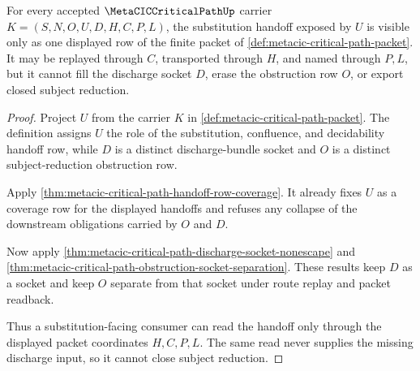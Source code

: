 \begin{theorem}
\label{thm:metacic-critical-path-substitution-handoff-visibility}
For every accepted $\MetaCICCriticalPathUp$ carrier $K=(S,N,O,U,D,H,C,P,L)$, the substitution handoff exposed by $U$ is visible only as one displayed row of the finite packet of \autoref{def:metacic-critical-path-packet}. It may be replayed through $C$, transported through $H$, and named through $P,L$, but it cannot fill the discharge socket $D$, erase the obstruction row $O$, or export closed subject reduction.
\end{theorem}
\begin{proof}
Project $U$ from the carrier $K$ in \autoref{def:metacic-critical-path-packet}. The definition assigns $U$ the role of the substitution, confluence, and decidability handoff row, while $D$ is a distinct discharge-bundle socket and $O$ is a distinct subject-reduction obstruction row.

Apply \autoref{thm:metacic-critical-path-handoff-row-coverage}. It already fixes $U$ as a coverage row for the displayed handoffs and refuses any collapse of the downstream obligations carried by $O$ and $D$.

Now apply \autoref{thm:metacic-critical-path-discharge-socket-nonescape} and \autoref{thm:metacic-critical-path-obstruction-socket-separation}. These results keep $D$ as a socket and keep $O$ separate from that socket under route replay and packet readback.

Thus a substitution-facing consumer can read the handoff only through the displayed packet coordinates $H,C,P,L$. The same read never supplies the missing discharge input, so it cannot close subject reduction.
\end{proof}

